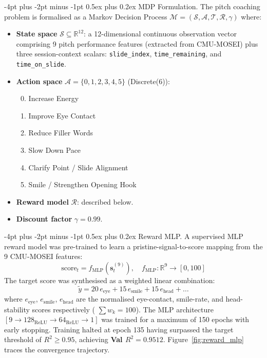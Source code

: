 \documentclass{article}
\makeatletter
\renewcommand\paragraph{\@startsection{paragraph}{4}{\z@}%
  {-4pt plus -2pt minus -1pt}%
  {0.5ex plus 0.2ex}%
  {\normalsize\bf}}
\makeatother
\begin{document}
\paragraph{MDP Formulation.}
The pitch coaching problem is formalised as a Markov Decision Process
$\mathcal{M} = (\mathcal{S}, \mathcal{A}, \mathcal{T}, \mathcal{R}, \gamma)$
where:
\begin{itemize}
    \item \textbf{State space} $\mathcal{S} \subseteq \mathbb{R}^{12}$:
    a 12-dimensional continuous observation vector comprising 9 pitch
    performance features (extracted from CMU-MOSEI)
    plus three session-context scalars: \texttt{slide\_index},
    \texttt{time\_remaining}, and \texttt{time\_on\_slide}.

    \item \textbf{Action space} $\mathcal{A} = \{0,1,2,3,4,5\}$ (Discrete(6)):
    \begin{enumerate}
        \setcounter{enumi}{-1}
        \item Increase Energy
        \item Improve Eye Contact
        \item Reduce Filler Words
        \item Slow Down Pace
        \item Clarify Point / Slide Alignment
        \item Smile / Strengthen Opening Hook
    \end{enumerate}

    \item \textbf{Reward model} $\mathcal{R}$: described below.

    \item \textbf{Discount factor} $\gamma = 0.99$.
\end{itemize}

\paragraph{Reward MLP.}
A supervised MLP reward model was pre-trained to learn a
pristine-signal-to-score mapping from the 9 CMU-MOSEI features:
\begin{equation}
\text{score}_t = f_{\text{MLP}}\!\left(\mathbf{s}_t^{(9)}\right), \quad f_{\text{MLP}} : \mathbb{R}^9 \to [0, 100]
\end{equation}
The target score was synthesised as a weighted linear combination:
\begin{equation}
\tilde{y} = 20\,e_\text{eye} + 15\,e_\text{smile} + 15\,e_\text{head} + \ldots
\label{eq:synthetic_score}
\end{equation}
where $e_\text{eye}$, $e_\text{smile}$, $e_\text{head}$ are the normalised
eye-contact, smile-rate, and head-stability scores respectively ( $\sum w_k = 100$).
The MLP architecture $[9 \to 128_{\text{ReLU}} \to 64_{\text{ReLU}} \to 1]$
was trained for a maximum of 150 epochs with early stopping.
Training halted at epoch 135 having surpassed the target threshold
of $R^2 \geq 0.95$, achieving \textbf{Val $R^2 = 0.9512$}.
Figure~\ref{fig:reward_mlp} traces the convergence trajectory.
\end{document}
